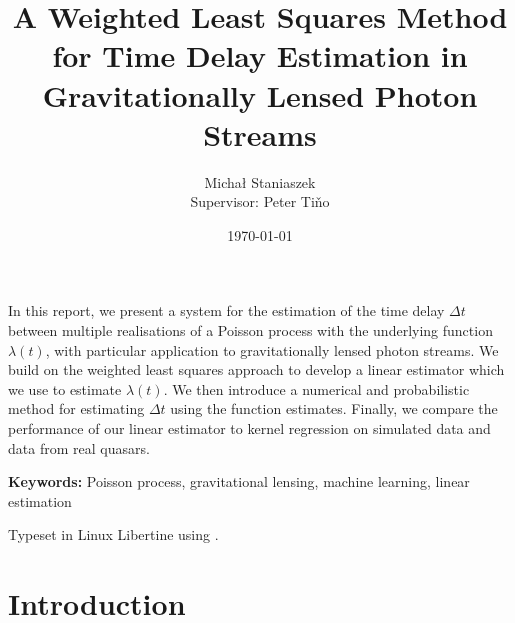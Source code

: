 \documentclass[a4paper,11pt]{article}
\title{A Weighted Least Squares Method for Time Delay Estimation in Gravitationally Lensed Photon Streams}
\author{\Large{Micha{\l} Staniaszek} \\\small{Supervisor: Peter Tiňo}}
\date{\today}
\begin{document}
\maketitle


\thispagestyle{empty}
\newpage
{}
In this report, we present a system for the estimation of the time delay $\Delta
t$ between multiple realisations of a Poisson process with the underlying
function $\lambda(t)$, with particular application to gravitationally lensed
photon streams. We build on the weighted least squares approach to develop a
linear estimator which we use to estimate $\lambda(t)$. We then introduce a
numerical and probabilistic method for estimating $\Delta t$ using the function
estimates. Finally, we compare the performance of our linear estimator to kernel
regression on simulated data and data from real quasars.

\vspace{1.0cm}\textbf{Keywords: }Poisson process, gravitational lensing,
 machine learning, linear estimation

\begin{center}
\vspace*{\fill}\scriptsize{Typeset in Linux Libertine using \XeLaTeX}.
\end{center}
\newpage
\tableofcontents
\newpage
{}
\section{Introduction}
\label{sec-1}
\end{document}
